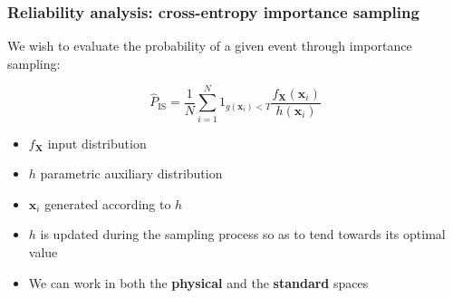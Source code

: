 \documentclass[aspectratio=169]{beamer}
\begin{document}
\begin{frame}[containsverbatim]
\frametitle{Reliability analysis: cross-entropy importance sampling}

We wish to evaluate the probability of a given event through importance sampling:

\begin{equation*}
\hat{P}_{\mbox{IS}} = \frac{1}{N} \sum_{i=1}^N 1_{g(\mathbf{x}_i)<T}\frac{f_\mathbf{X}(\mathbf{x}_i)}{h(\mathbf{x}_i)}
\end{equation*}
 
\begin{itemize}
\item $f_\mathbf{X}$ input distribution
 \item $h$ parametric auxiliary distribution
 \item $\mathbf{x}_i$ generated according to $h$
\end{itemize}

\begin{itemize}
\item $h$  is updated during the sampling process so as to tend towards its optimal value
\item We can work in both the \textbf{physical} and the \textbf{standard} spaces
\end{itemize}

\end{frame}

\end{document}
